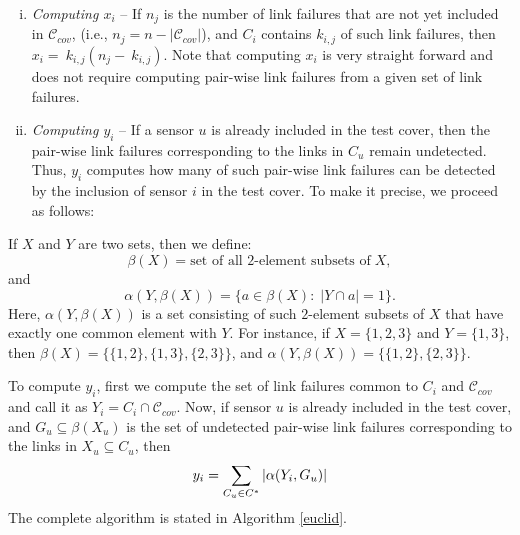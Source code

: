 \documentclass[twocolumn]{autart}
\begin{document}
\begin{enumerate}[(i)]
\item \textit{Computing $x_i$} -- If $n_j$ is the number of link failures that are not yet included in $\mathcal{C}_{cov}$, (i.e., $n_j = n- \lvert\mathcal{C}_{cov}\rvert$), and $C_i$ contains $k_{i,j}$ of such link failures, then $x_i =~k_{i,j}(n_j-~k_{i,j})$. Note that computing $x_i$ is very straight forward and does not require computing pair-wise link failures from a given set of link failures.

\item \textit{Computing $y_i$} -- If a sensor $u$ is already included in the test cover, then the pair-wise link failures corresponding to the links in $C_u$ remain undetected. Thus, $y_i$ computes how many of such pair-wise link failures can be detected by the inclusion of sensor $i$ in the test cover. To make it precise, we proceed as follows: \vspace{-0.25cm}
\end{enumerate}

If $X$ and $Y$ are two sets, then we define: \vspace{-0.35cm}
$$\beta(X) =  \text{set of all 2-element subsets of}\; X,$$ \vspace{-0.35cm}
and \vspace{-0.35cm}
\begin{equation*}
\label{eq:beta}
\alpha(Y,\beta(X)) = \{a\in\beta(X):\;\lvert Y \cap a \rvert = 1\}.
\end{equation*} 
Here, $\alpha(Y,\beta(X))$ is a set consisting of such $2$-element subsets of $X$ that have exactly one common element with $Y$. For instance, if $X=\{1,2,3\}$ and $Y=\{1,3\}$, then $\beta(X)=\{\{1,2\},\{1,3\},\{2,3\}\}$, and $\alpha(Y,\beta(X))=\{\{1,2\},\{2,3\}\}$. \vspace{-0.25cm}

To compute $y_i$, first we compute the set of link failures common to $C_i$ and $\mathcal{C}_{cov}$ and call it as $Y_i=C_i\cap\mathcal{C}_{cov}$. Now, if sensor $u$ is already included in the test cover, and $G_u\subseteq\beta(X_u)$ is the set of undetected pair-wise link failures corresponding to the links in $X_u\subseteq C_u$, then  \vspace{-0.35cm}
$$
y_i = \sum\limits_{C_u\in C^{\ast}}\left\vert \alpha(Y_i, G_{u})\right\vert \vspace{-0.35cm}
$$ 
The complete algorithm is stated in Algorithm \ref{euclid}.
\end{document}
